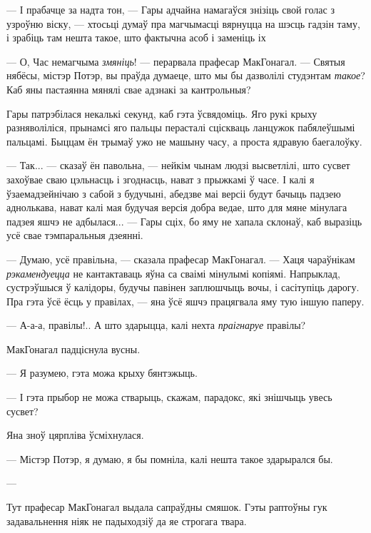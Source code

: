 --- І прабачце за надта  тон, --- Гары адчайна намагаўся знізіць
свой голас з узроўню віску, --- хтосьці думаў пра  магчымасці
вярнуцца на шэсць гадзін таму, і зрабіць там нешта такое, што  фактычна
 асоб і заменіць іх 

--- О, Час немагчыма \emph{змяніць}! --- перарвала прафесар МакГонагал. --- Святыя 
нябёсы, містэр Потэр, вы праўда думаеце, што мы бы дазволілі студэнтам \emph{такое}?
Каб яны пастаянна мянялі свае адзнакі за кантрольныя?

Гары патрэбілася некалькі секунд, каб гэта ўсвядоміць. Яго рукі крыху разняволіліся,
прынамсі яго пальцы перасталі сціскваць ланцужок пабялеўшымі пальцамі. 
Быццам ён трымаў ужо не машыну часу, а проста ядравую баегалоўку.

--- Так... --- сказаў ён павольна, --- нейкім чынам людзі высветлілі, што сусвет
захоўвае сваю цэльнасць і згоднасць, нават з прыжкамі ў часе. І калі я  
ўзаемадзейнічаю з сабой з будучыні, абедзве маі версіі будут бачыць падзею 
аднолькава, нават калі мая будучая версія добра ведае, што для мяне мінулага 
падзея яшчэ не адбылася... --- Гары сціх, бо яму не хапала склонаў, каб выразіць
усё свае тэмпаральныя дзеянні.

--- Думаю, усё правільна, --- сказала прафесар МакГонагал. --- Хаця чараўнікам
\emph{рэкамендуецца} не кантактаваць яўна са сваімі мінулымі копіямі. Напрыклад, 
сустрэўшыся ў калідоры, будучы павінен заплюшчыць вочы, і сасітупіць дарогу. 
Пра гэта ўсё ёсць у правілах, --- яна ўсё яшчэ працягвала яму тую іншую паперу. 

--- А-а-а, правілы!.. А што здарыцца, калі нехта \emph{праігнаруе} правілы? 

МакГонагал падціснула вусны. 

--- Я разумею, гэта можа крыху бянтэжыць.

--- І гэта прыбор не можа стварыць, скажам, парадокс, які знішчыць увесь сусвет?

Яна зноў цярпліва ўсміхнулася.

--- Містэр Потэр, я думаю, я бы помніла, калі нешта такое здарырался бы.

--- 

Тут прафесар МакГонагал выдала сапраўдны смяшок. Гэты раптоўны гук задавальнення
ніяк не падыходзіў да яе строгага твара. 

